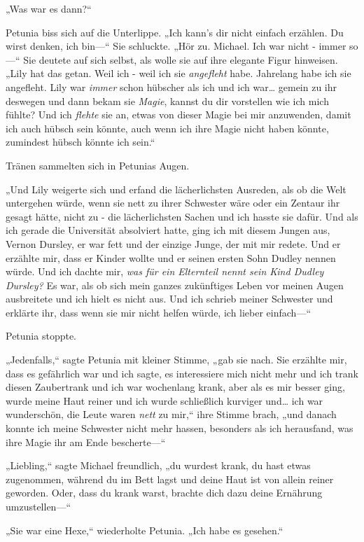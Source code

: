{„Was war es dann?“

Petunia biss sich auf die Unterlippe. „Ich kann's dir nicht einfach erzählen. Du wirst denken, ich bin—“ Sie schluckte. „Hör zu. Michael. Ich war nicht - immer so—“ Sie deutete auf sich selbst, als wolle sie auf ihre elegante Figur hinweisen. „Lily hat das getan. Weil ich - weil ich sie \emph{angefleht} habe. Jahrelang habe ich sie angefleht. Lily war \emph{immer} schon hübscher als ich und ich war… gemein zu ihr deswegen und dann bekam sie \emph{Magie}, kannst du dir vorstellen wie ich mich fühlte? Und ich \emph{flehte} sie an, etwas von dieser Magie bei mir anzuwenden, damit ich auch hübsch sein könnte, auch wenn ich ihre Magie nicht haben könnte, zumindest hübsch könnte ich sein.“

Tränen sammelten sich in Petunias Augen.

„Und Lily weigerte sich und erfand die lächerlichsten Ausreden, als ob die Welt untergehen würde, wenn sie nett zu ihrer Schwester wäre oder ein Zentaur ihr gesagt hätte, nicht zu - die lächerlichsten Sachen und ich hasste sie dafür. Und als ich gerade die Universität absolviert hatte, ging ich mit diesem Jungen aus, Vernon Dursley, er war fett und der einzige Junge, der mit mir redete. Und er erzählte mir, dass er Kinder wollte und er seinen ersten Sohn Dudley nennen würde. Und ich dachte mir, \emph{was für ein Elternteil nennt sein Kind Dudley Dursley?} Es war, als ob sich mein ganzes zukünftiges Leben vor meinen Augen ausbreitete und ich hielt es nicht aus. Und ich schrieb meiner Schwester und erklärte ihr, dass wenn sie mir nicht helfen würde, ich lieber einfach—“

Petunia stoppte.

„Jedenfalls,“ sagte Petunia mit kleiner Stimme, „gab sie nach. Sie erzählte mir, dass es gefährlich war und ich sagte, es interessiere mich nicht mehr und ich trank diesen Zaubertrank und ich war wochenlang krank, aber als es mir besser ging, wurde meine Haut reiner und ich wurde schließlich kurviger und… ich war wunderschön, die Leute waren \emph{nett} zu mir,“ ihre Stimme brach, „und danach konnte ich meine Schwester nicht mehr hassen, besonders als ich herausfand, was ihre Magie ihr am Ende bescherte—“

„Liebling,“ sagte Michael freundlich, „du wurdest krank, du hast etwas zugenommen, während du im Bett lagst und deine Haut ist von allein reiner geworden. Oder, dass du krank warst, brachte dich dazu deine Ernährung umzustellen—“

„Sie war eine Hexe,“ wiederholte Petunia. „Ich habe es gesehen.“

}
